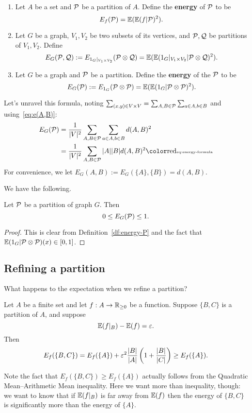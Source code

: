 \begin{df}
\begin{enumerate}
\item
Let $A$ be a set and $\cal P$ be a partition of $A$. Define the \textbf{energy} of $\cal P$ to be
\[
E_f(\cal P)=\E(\E(f|\cal P)^2).
\]
\item
Let $G$ be a graph, $V_1,V_2$ be two subsets of its vertices, and $\cal P, \cal Q$ be partitions of $V_1,V_2$.
Define
\[
E_G(\cal P, \cal Q):=E_{1_G|_{V_1\times V_2}}(\cal P\ot \cal Q)=\E(\E(1_G|_{V_1\times V_2}|\cal P\ot \cal Q)^2).
\]
\item
Let $G$ be a graph and $\cal P$ be a partition.
Define the \textbf{energy} of the $\cal P$ to be
\[
E_G(\cal P):=E_{1_G}(\cal P\ot \cal P)=\E(\E(1_G|\cal P\ot \cal P)^2).
\]
\end{enumerate}
\end{df}
Let's unravel this formula, noting $\sum_{(x,y)\in V\times V}=\sum_{A,B\in \cal P}\sum_{a\in A,b\in B}$ and using~\eqref{eq:e(A,B)}:
\begin{align}
\nonumber
E_G(\cal P)&=\rc{|V|^2}\sum_{A,B\in \cal P}\sum_{a\in A,b\in B}
d(A,B)^2\\
&=\rc{|V|^2}\sum_{A,B\in \cal P}|A||B|
d(A,B)^2
\llabel{eq:energy-formula}
\end{align}
For convenience, we let $E_G(A,B):=E_G(\{A\},\{B\})=d(A,B)$.

We have the following.
\begin{lem}
Let $\cal P$ be a partition of graph $G$. Then
\[
0\le E_G(\cal P)\le 1.
\]
\end{lem}
\begin{proof}
This is clear from Definition~\ref{df:energy-P} and the fact that $\E(1_G|\cal P\ot \cal P)(x)\in [0,1]$.
\end{proof}

\subsection{Refining a partition}
What happens to the expectation when we refine a partition?
\begin{lem}
Let $A$ be a finite set and let $f:A\to \R_{\ge0}$ be a function. Suppose $\{B,C\}$ is a partition of $A$, and suppose
\[
\E(f|_B)-\E(f)=\ep.
\]
Then
\[
E_f(\{B,C\})=E_f(\{A\})+\ep^2\fc{|B|}{|A|}\pa{1+\fc{|B|}{|C|}}\ge E_f(\{A\}).
\]
\end{lem}
Note the fact that $E_f(\{B,C\})\ge E_f(\{A\})$ actually follows from the Quadratic Mean--Arithmetic Mean inequality. Here we want more than inequality, though: we want to know that if $\E(f|_B)$ is far away from $\E(f)$ then the energy of $\{B,C\}$ is significantly more than the energy of $\{A\}$.

